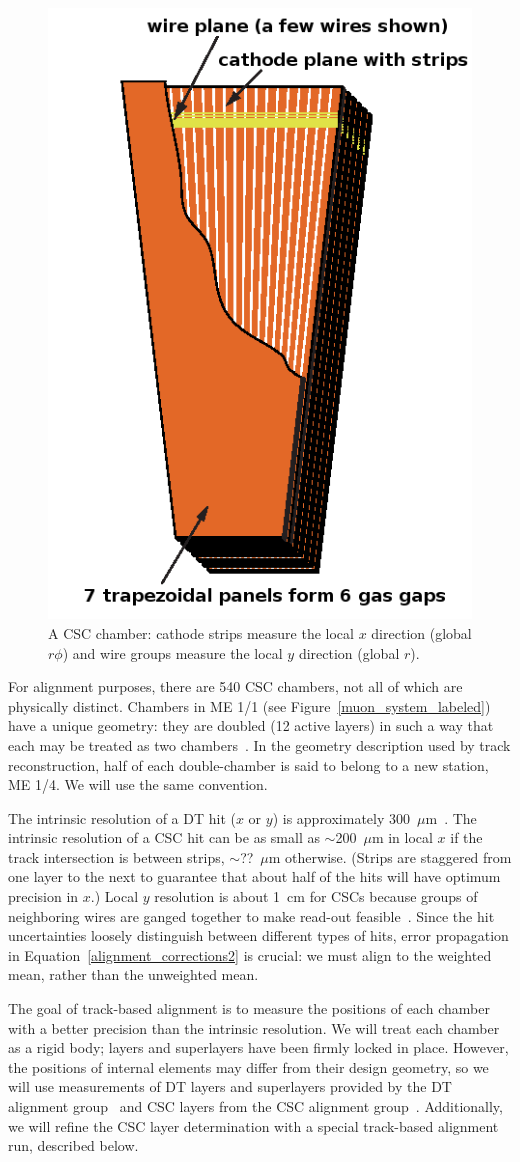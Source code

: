 \documentclass[12pt]{article}
\begin{document}
\begin{figure}
\begin{center}
\includegraphics[width=0.3\linewidth]{intro/csc_chamber.png}
\end{center}

\caption{\label{csc_chamber} A CSC chamber: cathode strips measure the
  local $x$ direction (global $r\phi$) and wire groups measure the
  local $y$ direction (global $r$).}
\end{figure}

For alignment purposes, there are 540 CSC chambers, not all of which
are physically distinct.  Chambers in ME 1/1 (see
Figure~\ref{muon_system_labeled}) have a unique geometry: they are
doubled (12 active layers) in such a way that each may be treated as two
chambers~\cite{doubling_up_me11}.  In the geometry description used by
track reconstruction, half of each double-chamber is said to belong to
a new station, ME 1/4.  We will use the same convention.

The intrinsic resolution of a DT hit ($x$ or $y$) is approximately
300~$\mu$m~\cite{intrinsic_dt_resolution}.  The intrinsic resolution
of a CSC hit can be as small as $\sim$200~$\mu$m in local $x$ if the
track intersection is between strips, $\sim$??~$\mu$m otherwise.
(Strips are staggered from one layer to the next to guarantee that
about half of the hits will have optimum precision in $x$.)  Local $y$
resolution is about 1~cm for CSCs because groups of neighboring wires
are ganged together to make read-out
feasible~\cite{intrinsic_csc_resolution}.  Since the hit uncertainties
loosely distinguish between different types of hits, error propagation
in Equation~\ref{alignment_corrections2} is crucial: we must align to
the weighted mean, rather than the unweighted mean.

The goal of track-based alignment is to measure the positions of each
chamber with a better precision than the intrinsic resolution.  We
will treat each chamber as a rigid body; layers and superlayers have
been firmly locked in place.  However, the positions of internal
elements may differ from their design geometry, so we will use
measurements of DT layers and superlayers provided by the DT alignment
group~\cite{dt_alignment_group} and CSC layers from the CSC alignment
group~\cite{csc_alignment_group}.  Additionally, we will refine the
CSC layer determination with a special track-based alignment run,
described below.
\end{document}
